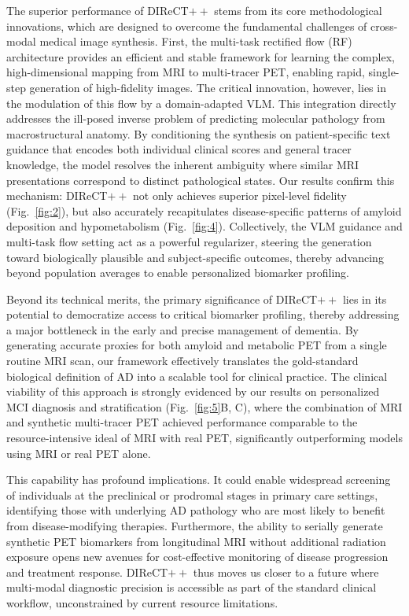 \documentclass{article}
\begin{document}
The superior performance of DIReCT$++$ stems from its core methodological innovations, which are designed to overcome the fundamental challenges of cross-modal medical image synthesis. First, the multi-task rectified flow (RF) architecture provides an efficient and stable framework for learning the complex, high-dimensional mapping from MRI to multi-tracer PET, enabling rapid, single-step generation of high-fidelity images. The critical innovation, however, lies in the modulation of this flow by a domain-adapted VLM. This integration directly addresses the ill-posed inverse problem of predicting molecular pathology from macrostructural anatomy. By conditioning the synthesis on patient-specific text guidance that encodes both individual clinical scores and general tracer knowledge, the model resolves the inherent ambiguity where similar MRI presentations correspond to distinct pathological states. Our results confirm this mechanism: DIReCT$++$ not only achieves superior pixel-level fidelity (Fig.~\ref{fig:2}), but also accurately recapitulates disease-specific patterns of amyloid deposition and hypometabolism (Fig.~\ref{fig:4}). Collectively, the VLM guidance and multi-task flow setting act as a powerful regularizer, steering the generation toward biologically plausible and subject-specific outcomes, thereby advancing beyond population averages to enable personalized biomarker profiling.

Beyond its technical merits, the primary significance of DIReCT$++$ lies in its potential to democratize access to critical biomarker profiling, thereby addressing a major bottleneck in the early and precise management of dementia. By generating accurate proxies for both amyloid and metabolic PET from a single routine MRI scan, our framework effectively translates the gold-standard biological definition of AD into a scalable tool for clinical practice. The clinical viability of this approach is strongly evidenced by our results on personalized MCI diagnosis and stratification (Fig.~\ref{fig:5}B, C), where the combination of MRI and synthetic multi-tracer PET achieved performance comparable to the resource-intensive ideal of MRI with real PET, significantly outperforming models using MRI or real PET alone. 

This capability has profound implications. It could enable widespread screening of individuals at the preclinical or prodromal stages in primary care settings, identifying those with underlying AD pathology who are most likely to benefit from disease-modifying therapies. Furthermore, the ability to serially generate synthetic PET biomarkers from longitudinal MRI without additional radiation exposure opens new avenues for cost-effective monitoring of disease progression and treatment response. DIReCT$++$ thus moves us closer to a future where multi-modal diagnostic precision is accessible as part of the standard clinical workflow, unconstrained by current resource limitations.
\end{document}
